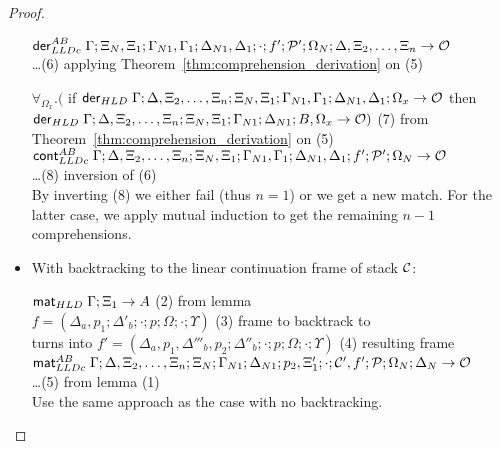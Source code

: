 \begin{proof}
\begin{itemize}[leftmargin=*]
      $\mathsf{der}_{LLDc}^{AB} \; \Gamma; \Xi_N, \Xi_1; \Gamma_{N1}, \Gamma_1; \Delta_{N1}, \Delta_1;
            \cdot; f'; \mathcal{P'}; \Omega_N; \Delta, \Xi_2, \dotsc, \Xi_n \rightarrow \mathcal{O}$
      \\ \dots \hfill (6) applying Theorem~\ref{thm:comprehension_derivation} on (5)

      $\forall_{\Omega_x}. ($ if $\mathsf{der}_{HLD} \; \Gamma; \Delta, \Xi_2, \dotsc, \Xi_n; \Xi_N, \Xi_1;
            \Gamma_{N1}, \Gamma_1; \Delta_{N1}, \Delta_1; \Omega_x \rightarrow
            \mathcal{O}$ then \\ \hspace*{0.5cm} $\mathsf{der}_{HLD} \; \Gamma;
            \Delta, \Xi_2, \dotsc, \Xi_n; \Xi_N, \Xi_1; \Gamma_{N1}; \Delta_{N1}; B, \Omega_x
            \rightarrow \mathcal{O})$ \hfill (7) from
      Theorem~\ref{thm:comprehension_derivation} on (5) \\

      $\mathsf{cont}_{LLDc}^{AB} \; \Gamma; \Delta, \Xi_2, \dotsc, \Xi_n; \Xi_N, \Xi_1; \Gamma_{N1},
         \Gamma_1; \Delta_{N1}, \Delta_1; f'; \mathcal{P'}; \Omega_N
         \rightarrow \mathcal{O}$\\ \dots \hfill (8) inversion of (6) \\
        
        By inverting (8) we either fail (thus $n = 1$) or we get a new match.
        For the latter case, we apply mutual induction to get the remaining $n -
        1$ comprehensions.
      
   \item With backtracking to the linear continuation frame of stack $\mathcal{C}$:
      
      $\mathsf{mat}_{HLD} \; \Gamma; \Xi_1 \rightarrow A$ \hfill (2) from lemma \\

      $f = (\Delta_a, p_1; \Delta'_b; \cdot; p; \Omega; \cdot; \Upsilon)$ \hfill (3) frame to backtrack to \\
      turns into $f' = (\Delta_a, p_1, \Delta'''_b, p_2; \Delta''_b; \cdot; p; \Omega; \cdot; \Upsilon)$ \hfill (4) resulting frame \\

      $\mathsf{mat}_{LLDc}^{AB} \; \Gamma; \Delta, \Xi_2, \dotsc, \Xi_n; \Xi_N; \Gamma_{N1};
\Delta_{N1}; p_2, \Xi'_1; \cdot; \mathcal{C'}, f'; \mathcal{P}; \Omega_N; \Delta_N \rightarrow
\mathcal{O}$\\ \dots \hfill (5) from lemma (1) \\
      
      Use the same approach as the case with no backtracking.
      

\end{itemize}
\end{proof}
